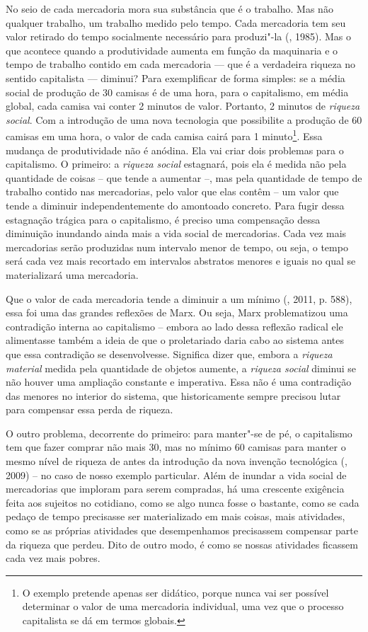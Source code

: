 No seio de cada mercadoria mora sua substância que é o trabalho. Mas não
qualquer trabalho, um trabalho medido pelo tempo. Cada mercadoria tem
seu valor retirado do tempo socialmente necessário para produzi"-la
(, 1985). Mas o que acontece quando a produtividade aumenta em
função da maquinaria e o tempo de trabalho contido em cada mercadoria
--- que é a verdadeira riqueza no sentido capitalista --- diminui? Para
exemplificar de forma simples: se a média social de produção de 30
camisas é de uma hora, para o capitalismo, em média global, cada camisa
vai conter 2 minutos de valor. Portanto, 2 minutos de \emph{riqueza
social}. Com a introdução de uma nova tecnologia que possibilite a
produção de 60 camisas em uma hora, o valor de cada camisa cairá para 1
minuto\footnote{O exemplo pretende apenas ser didático, porque nunca vai
  ser possível determinar o valor de uma mercadoria individual, uma vez
  que o processo capitalista se dá em termos globais.}. Essa mudança de
produtividade não é anódina. Ela vai criar dois problemas para o
capitalismo. O primeiro: a \emph{riqueza social} estagnará, pois ela é
medida não pela quantidade de coisas -- que tende a aumentar --, mas
pela quantidade de tempo de trabalho contido nas mercadorias, pelo valor
que elas contêm -- um valor que tende a diminuir independentemente do
amontoado concreto. Para fugir dessa estagnação trágica para o
capitalismo, é preciso uma compensação dessa diminuição inundando ainda
mais a vida social de mercadorias. Cada vez mais mercadorias serão
produzidas num intervalo menor de tempo, ou seja, o tempo será cada vez
mais recortado em intervalos abstratos menores e iguais no qual se
materializará uma mercadoria.

Que o valor de cada mercadoria tende a diminuir a um mínimo (, 2011,
p. 588), essa foi uma das grandes reflexões de Marx. Ou seja, Marx
problematizou uma contradição interna ao capitalismo -- embora ao lado
dessa reflexão radical ele alimentasse também a ideia de que o
proletariado daria cabo ao sistema antes que essa contradição se
desenvolvesse. Significa dizer que, embora a \emph{riqueza material}
medida pela quantidade de objetos aumente, a \emph{riqueza social}
diminui se não houver uma ampliação constante e imperativa. Essa não é
uma contradição das menores no interior do sistema, que historicamente
sempre precisou lutar para compensar essa perda de riqueza.

O outro problema, decorrente do primeiro: para manter"-se de pé, o
capitalismo tem que fazer comprar não mais 30, mas no mínimo 60 camisas
para manter o mesmo nível de riqueza de antes da introdução da nova
invenção tecnológica (, 2009) -- no caso de nosso exemplo
particular. Além de inundar a vida social de mercadorias que imploram
para serem compradas, há uma crescente exigência feita aos sujeitos no
cotidiano, como se algo nunca fosse o bastante, como se cada pedaço de
tempo precisasse ser materializado em mais coisas, mais atividades, como
se as próprias atividades que desempenhamos precisassem compensar parte
da riqueza que perdeu. Dito de outro modo, é como se nossas atividades
ficassem cada vez mais pobres.

